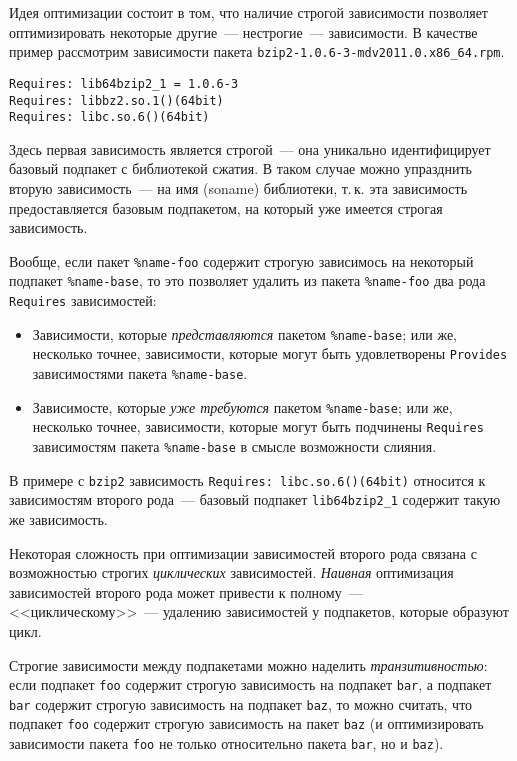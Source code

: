 \documentclass[russian,a4paper,12pt,titlepage]{article}
\begin{document}
Идея оптимизации состоит в том, что наличие строгой зависимости позволяет
оптимизировать некоторые другие~--- нестрогие~--- зависимости.  В качестве пример
рассмотрим зависимости пакета \verb|bzip2-1.0.6-3-mdv2011.0.x86_64.rpm|.
\begin{verbatim}
Requires: lib64bzip2_1 = 1.0.6-3
Requires: libbz2.so.1()(64bit)
Requires: libc.so.6()(64bit)
\end{verbatim}
Здесь первая зависимость является строгой~--- она уникально идентифицирует базовый подпакет с библиотекой сжатия.
В таком случае можно упразднить вторую зависимость~--- на имя (soname) библиотеки, т.\,к. эта зависимость предоставляется
базовым подпакетом, на который уже имеется строгая зависимость.

Вообще, если пакет \verb|%name-foo| содержит строгую зависимось на некоторый подпакет \verb|%name-base|,
то это позволяет удалить из пакета \verb|%name-foo| два рода \verb|Requires| зависимостей:
\begin{itemize}
\item Зависимости, которые \textit{представляются} пакетом \verb|%name-base|; или же, несколько точнее,
зависимости, которые могут быть удовлетворены \verb|Provides| зависимостями пакета \verb|%name-base|.
\item Зависимосте, которые \textit{уже требуются} пакетом \verb|%name-base|; или же, несколько точнее,
зависимости, которые могут быть подчинены \verb|Requires| зависимостям пакета \verb|%name-base|
в смысле возможности слияния.
\end{itemize}
В примере с \verb|bzip2| зависимость \verb|Requires: libc.so.6()(64bit)| относится к зависимостям второго рода~---
базовый подпакет \verb|lib64bzip2_1| содержит такую же зависимость.

Некоторая сложность при оптимизации зависимостей второго рода связана с возможностью строгих \textit{циклических}
зависимостей.  \textit{Наивная} оптимизация зависимостей второго рода может привести к полному~--- <<циклическому>>~---
удалению зависимостей у подпакетов, которые образуют цикл.

Строгие зависимости между подпакетами можно наделить \textit{транзитивностью}: если подпакет \verb|foo| содержит
строгую зависимость на подпакет \verb|bar|, а подпакет \verb|bar| содержит строгую зависимость на подпакет \verb|baz|,
то можно считать, что подпакет \verb|foo| содержит строгую зависимость на пакет \verb|baz| (и оптимизировать зависимости
пакета \verb|foo| не только относительно пакета \verb|bar|, но и \verb|baz|).
\end{document}

